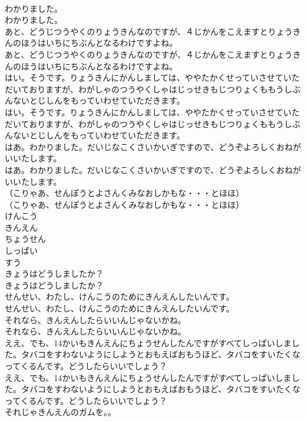 \documentclass[8pt]{extreport}
\begin{document}
\begin{CJK}{UTF8}{min}
\\	わかりました。
\\	わかりました。
\\	あと、どうじつうやくのりょうきんなのですが、４じかんをこえますとりょうきんのほうはいちにちぶんとなるわけですよね。
\\	あと、どうじつうやくのりょうきんなのですが、４じかんをこえますとりょうきんのほうはいちにちぶんとなるわけですよね。
\\	はい。そうです。りょうきんにかんしましては、ややたかくせっていさせていただいておりますが、わがしゃのつうやくしゃはじっせきもじつりょくももうしぶんないとじしんをもっていわせていただきます。
\\	はい。そうです。りょうきんにかんしましては、ややたかくせっていさせていただいておりますが、わがしゃのつうやくしゃはじっせきもじつりょくももうしぶんないとじしんをもっていわせていただきます。
\\	はあ。わかりました。だいじなこくさいかいぎですので、どうぞよろしくおねがいいたします。
\\	はあ。わかりました。だいじなこくさいかいぎですので、どうぞよろしくおねがいいたします。
\\	（こりゃあ、せんぽうとよさんくみなおしかもな・・・とほほ）
\\	（こりゃあ、せんぽうとよさんくみなおしかもな・・・とほほ）
\\	けんこう
\\	きんえん
\\	ちょうせん
\\	しっぱい
\\	すう
\\	きょうはどうしましたか？
\\	きょうはどうしましたか？
\\	せんせい、わたし、けんこうのためにきんえんしたいんです。
\\	せんせい、わたし、けんこうのためにきんえんしたいんです。
\\	それなら、きんえんしたらいいんじゃないかね。
\\	それなら、きんえんしたらいいんじゃないかね。
\\	ええ、でも、14かいもきんえんにちょうせんしたんですがすべてしっぱいしました。タバコをすわないようにしようとおもえばおもうほど、タバコをすいたくなってくるんです。どうしたらいいでしょう？
\\	ええ、でも、14かいもきんえんにちょうせんしたんですがすべてしっぱいしました。タバコをすわないようにしようとおもえばおもうほど、タバコをすいたくなってくるんです。どうしたらいいでしょう？
\\	それじゃきんえんのガムを。。

\end{CJK}
\end{document}
